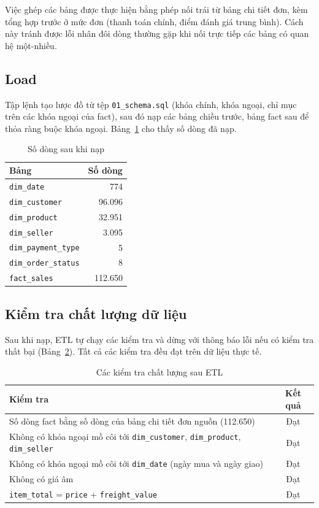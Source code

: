 \documentclass[12pt,a4paper]{article}
\newcommand{\code}[1]{\texttt{\small #1}}
\begin{document}
Việc ghép các bảng được thực hiện bằng phép nối trái từ bảng chi tiết đơn, kèm tổng hợp trước ở mức đơn
(thanh toán chính, điểm đánh giá trung bình). Cách này tránh được lỗi nhân đôi dòng thường gặp khi nối trực tiếp
các bảng có quan hệ một-nhiều.

\subsection{Load}
Tập lệnh tạo lược đồ từ tệp \code{01\_schema.sql} (khóa chính, khóa ngoại, chỉ mục trên các khóa ngoại của fact),
sau đó nạp các bảng chiều trước, bảng fact sau để thỏa ràng buộc khóa ngoại. Bảng~\ref{tab:load} cho thấy số dòng
đã nạp.

\begin{table}[h]
\centering
\caption{Số dòng sau khi nạp}\label{tab:load}
\small
\begin{tabular}{@{}l r@{}}
\toprule
\textbf{Bảng} & \textbf{Số dòng}\\
\midrule
\code{dim\_date} & 774\\
\code{dim\_customer} & 96.096\\
\code{dim\_product} & 32.951\\
\code{dim\_seller} & 3.095\\
\code{dim\_payment\_type} & 5\\
\code{dim\_order\_status} & 8\\
\code{fact\_sales} & 112.650\\
\bottomrule
\end{tabular}
\end{table}

\subsection{Kiểm tra chất lượng dữ liệu}
Sau khi nạp, ETL tự chạy các kiểm tra và dừng với thông báo lỗi nếu có kiểm tra thất bại (Bảng~\ref{tab:dq}).
Tất cả các kiểm tra đều đạt trên dữ liệu thực tế.

\begin{table}[h]
\centering
\caption{Các kiểm tra chất lượng sau ETL}\label{tab:dq}
\small
\begin{tabularx}{\textwidth}{@{}X c@{}}
\toprule
\textbf{Kiểm tra} & \textbf{Kết quả}\\
\midrule
Số dòng fact bằng số dòng của bảng chi tiết đơn nguồn (112.650) & Đạt\\
Không có khóa ngoại mồ côi tới \code{dim\_customer}, \code{dim\_product}, \code{dim\_seller} & Đạt\\
Không có khóa ngoại mồ côi tới \code{dim\_date} (ngày mua và ngày giao) & Đạt\\
Không có giá âm & Đạt\\
\code{item\_total} = \code{price} + \code{freight\_value} & Đạt\\
\bottomrule
\end{tabularx}
\end{table}
\end{document}
